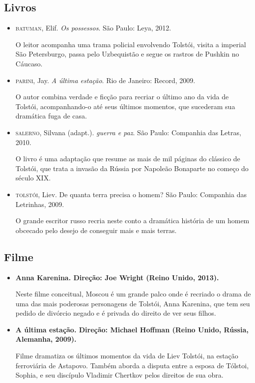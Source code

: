 \documentclass[12pt]{extarticle}
\begin{document}
\subsection{Livros}

\begin{itemize}
\item\textsc{batuman}, Elif. \textit{Os possessos}. São Paulo: Leya, 2012.

O leitor acompanha uma trama policial envolvendo Tolstói, visita a
imperial São Petersburgo, passa pelo Uzbequistão e segue os rastros de
Pushkin no Cáucaso.

\item\textsc{parini}, Jay. \textit{A última estação}. Rio de Janeiro: Record, 2009.

O autor combina verdade e ficção para recriar o último ano da vida de
Tolstói, acompanhando-o até seus últimos momentos, que sucederam sua
dramática fuga de casa.

\item\textsc{salerno}, Silvana (adapt.). \textit{guerra e paz}. São Paulo: Companhia
das Letras, 2010.

O livro é uma adaptação que resume as mais de mil páginas do clássico de
Tolstói, que trata a invasão da Rússia por Napoleão Bonaparte no começo
do século XIX.

\item\textsc{tolstói}, Liev. De quanta terra precisa o homem? São Paulo:
Companhia das Letrinhas, 2009.

O grande escritor russo recria neste conto a dramática história de um
homem obcecado pelo desejo de conseguir mais e mais terras.
\end{itemize}

\subsection{Filme}

\begin{itemize}
\item\textbf{Anna Karenina. Direção: Joe Wright (Reino Unido, 2013).}

Neste filme conceitual, Moscou é um grande palco onde é recriado o drama
de uma das mais poderosas personagens de Tolstói, Anna Karenina, que tem
seu pedido de divórcio negado e é privada do direito de ver seus filhos.

\item\textbf{A última estação. Direção: Michael Hoffman (Reino Unido, Rússia,
Alemanha, 2009).}

Filme dramatiza os últimos momentos da vida de Liev Tolstói, na estação
ferroviária de Astapovo. Também aborda a disputa entre a esposa de
Tólstoi, Sophia, e seu discípulo Vladimir Chertkov pelos direitos de sua
obra.
\end{itemize}
\end{document}
